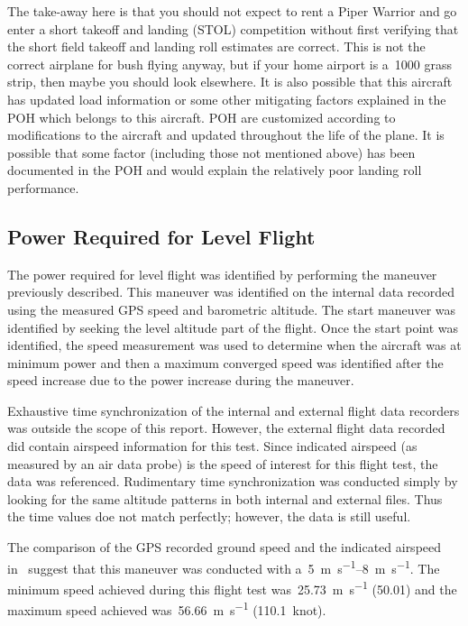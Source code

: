 \documentclass[conf]{new-aiaa}
\begin{document}
The take-away here is that you should not expect to rent a Piper Warrior and go enter a short takeoff and landing (STOL) competition without first verifying that the short field takeoff and landing roll estimates are correct. This is not the correct airplane for bush flying anyway, but if your home airport is a~\SI{1000}{\foot} grass strip, then maybe you should look elsewhere. It is also possible that this aircraft has updated load information or some other mitigating factors explained in the POH which belongs to this aircraft. POH are customized according to modifications to the aircraft and updated throughout the life of the plane. It is possible that some factor (including those not mentioned above) has been documented in the POH and would explain the relatively poor landing roll performance.

\FloatBarrier

\subsection{Power Required for Level Flight}

The power required for level flight was identified by performing the maneuver previously described. This maneuver was identified on the internal data recorded using the measured GPS speed and barometric altitude. The start maneuver was identified by seeking the level altitude part of the flight. Once the start point was identified, the speed measurement was used to determine when the aircraft was at minimum power and then a maximum converged speed was identified after the speed increase due to the power increase during the maneuver.

Exhaustive time synchronization of the internal and external flight data recorders was outside the scope of this report. However, the external flight data recorded did contain airspeed information for this test. Since indicated airspeed (as measured by an air data probe) is the speed of interest for this flight test, the data was referenced. Rudimentary time synchronization was conducted simply by looking for the same altitude patterns in both internal and external files. Thus the time values doe not match perfectly; however, the data is still useful.

The comparison of the GPS recorded ground speed and the indicated airspeed in~ suggest that this maneuver was conducted with a~\SIrange{5}{8}{\meter\per\second}. The minimum speed achieved during this flight test was~\SI{25.73}{\meter\per\second} (\SI{50.01}{\kts}) and the maximum speed achieved was~\SI{56.66}{\meter\per\second} (\SI{110.1}{knot}).
\end{document}
